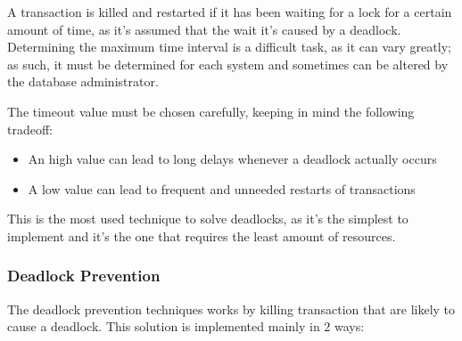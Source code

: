 \documentclass[english]{article}
\begin{document}
A transaction is killed and restarted if it has been waiting for a lock for a certain amount of time, as it's assumed that the wait it's caused by a deadlock.
Determining the maximum time interval is a difficult task, as it can vary greatly;
as such, it must be determined for each system and sometimes can be altered by the database administrator.

The timeout value must be chosen carefully, keeping in mind the following tradeoff:

\begin{itemize}
  \item An high value can lead to long delays whenever a deadlock actually occurs
  \item A low value can lead to frequent and unneeded restarts of transactions
\end{itemize}

This is the most used technique to solve deadlocks, as it's the simplest to implement and it's the one that requires the least amount of resources.

\subsubsection{Deadlock Prevention}

The deadlock prevention techniques works by killing transaction that are likely to cause a deadlock.
This solution is implemented mainly in \(2\) ways:
\end{document}

